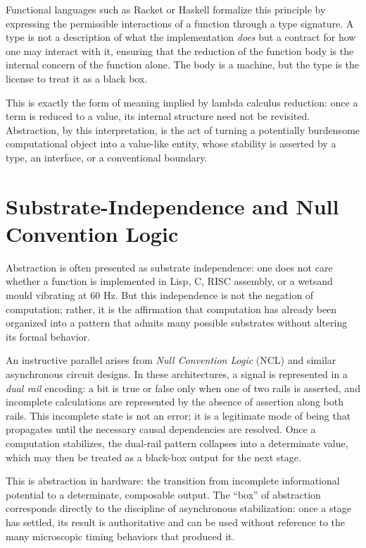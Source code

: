 \documentclass[11pt,letterpaper]{article}
\begin{document}
Functional languages such as Racket or Haskell formalize this principle by expressing the permissible interactions of a function through a type signature. A type is not a description of what the implementation \emph{does} but a contract for how one may interact with it, ensuring that the reduction of the function body is the internal concern of the function alone. The body is a machine, but the type is the license to treat it as a black box.

This is exactly the form of meaning implied by lambda calculus reduction: once a term is reduced to a value, its internal structure need not be revisited. Abstraction, by this interpretation, is the act of turning a potentially burdensome computational object into a value-like entity, whose stability is asserted by a type, an interface, or a conventional boundary.

\section{Substrate-Independence and Null Convention Logic}

Abstraction is often presented as substrate independence: one does not care whether a function is implemented in Lisp, C, RISC assembly, or a wetsand mould vibrating at 60 Hz. But this independence is not the negation of computation; rather, it is the affirmation that computation has already been organized into a pattern that admits many possible substrates without altering its formal behavior.

An instructive parallel arises from \emph{Null Convention Logic} (NCL) and similar asynchronous circuit designs. In these architectures, a signal is represented in a \emph{dual rail} encoding: a bit is true or false only when one of two rails is asserted, and incomplete calculations are represented by the absence of assertion along both rails. This incomplete state is not an error; it is a legitimate mode of being that propagates until the necessary causal dependencies are resolved. Once a computation stabilizes, the dual-rail pattern collapses into a determinate value, which may then be treated as a black-box output for the next stage.

This is abstraction in hardware: the transition from incomplete informational potential to a determinate, composable output. The “box” of abstraction corresponds directly to the discipline of asynchronous stabilization: once a stage has settled, its result is authoritative and can be used without reference to the many microscopic timing behaviors that produced it.
\end{document}
